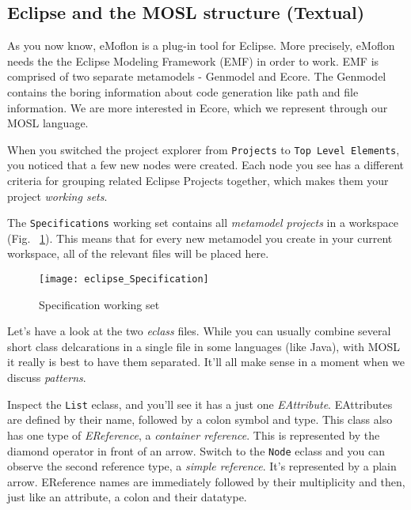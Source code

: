 \newpage
\texHeader

\subsection{Eclipse and the MOSL structure (Textual)}

As\hypertarget{projectStructure tex}{} you now know, eMoflon is a plug-in tool for Eclipse. More precisely, eMoflon needs the the Eclipse Modeling Framework (EMF) in order to work. EMF is comprised of two separate metamodels - Genmodel and Ecore. The Genmodel contains the boring information about code generation like path and file information. 
We are more interested in Ecore, which we represent through our MOSL language. 

When you switched the project explorer from \texttt{Projects} to \texttt{Top Level Elements}, you noticed that a few new nodes were created. Each node you see has a different criteria for grouping related Eclipse Projects together, which makes them your project \emph{working sets}. 

The \texttt{Specifications} working set contains all \emph{metamodel projects} in a workspace (Fig. ~\ref{fig_modelSpecification}). This means that for every new metamodel you create in your current workspace, all of the relevant files will be placed here.

 \begin{figure}[htbp]
  \centering
  \texttt{[image: eclipse\_Specification]}
  \caption{Specification working set}
  \label{fig_modelSpecification}
\end{figure}
  

Let's have a look at the two \emph{eclass} files. While you can usually combine several short class delcarations in a single file in some languages (like Java), with MOSL it really is best to have them separated. It'll all make sense in a moment when we discuss \emph{patterns}.

Inspect the \texttt{List} eclass, and you'll see it has a just one \emph{EAttribute}. EAttributes are defined by their name, followed by a colon symbol and type. This class also has one type of \emph{EReference}, a \emph{container reference}. This is represented by the diamond operator in front of an arrow. Switch to the \texttt{Node} eclass and you can observe the second reference type, a \emph{simple reference}. It's represented by a plain arrow. EReference names are immediately followed by their multiplicity and then, just like an attribute, a colon and their datatype.

